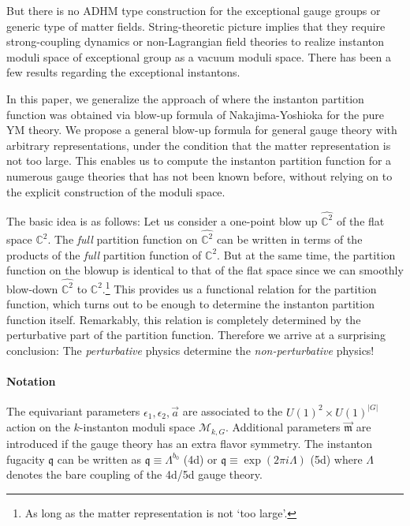\documentclass[letterpaper, 11pt]{article}
\def\IC{\mathbb{C}}
\begin{document}
But there is no ADHM type construction for the exceptional gauge groups or generic type of matter fields. String-theoretic picture implies that they require strong-coupling dynamics or non-Lagrangian field theories to realize instanton moduli space of exceptional group as a vacuum moduli space. There has been a few results regarding the exceptional instantons. 

In this paper, we generalize the approach of \cite{Keller:2012da} where the instanton partition function was obtained via blow-up formula of Nakajima-Yoshioka \cite{Nakajima:2003pg,Nakajima:2003uh,Nakajima:2005fg} for the pure YM theory. We propose a general blow-up formula for general gauge theory with arbitrary representations, under the condition that the matter representation is not too large. This enables us to compute the instanton partition function for a numerous gauge theories that has not been known before, without relying on to the explicit construction of the moduli space. 

The basic idea is as follows: Let us consider a one-point blow up $\hat{\IC^2}$ of the flat space $\IC^2$. The \emph{full} partition function on $\hat{\IC^2}$ can be written in terms of the products of the \emph{full} partition function of $\IC^2$. But at the same time, the partition function on the blowup is identical to that of the flat space since we can smoothly blow-down $\hat{\IC^2}$ to $\IC^2$.\footnote{As long as the matter representation is not `too large'.} This provides us a functional relation for the partition function, which turns out to be enough to determine the instanton partition function itself. Remarkably, this relation is completely determined by the perturbative part of the partition function. Therefore we arrive at a surprising conclusion: The \emph{perturbative} physics determine the \emph{non-perturbative} physics! 




\paragraph{Notation}
The equivariant parameters $\epsilon_{1}, \epsilon_2, \vec{a}$ are associated to the $U(1)^2 \times U(1)^{|G|}$ action on the $k$-instanton moduli space $\mathcal{M}_{k,G}$. Additional parameters $\vec{\mathfrak{m}}$ are introduced if the gauge theory has an extra  flavor symmetry. The instanton fugacity $\mathfrak{q}$ can be written as $\mathfrak{q}\equiv\Lambda^{b_0}$ (4d) or $\mathfrak{q}\equiv \exp(2\pi i \Lambda)$ (5d) where $\Lambda$ denotes the bare coupling of the 4d/5d gauge theory.
\end{document}
